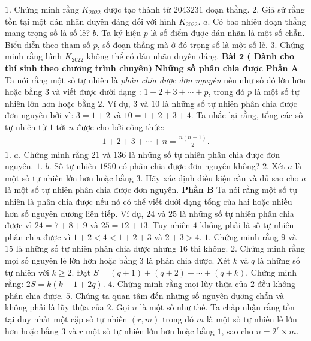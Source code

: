 \begin{multicols}{2}
	\vskip 0.1cm
	$1.$ Chứng minh rằng $K_{2022}$ được tạo thành từ $2 043 231$ đoạn thẳng.
	\vskip 0.1cm
	$2.$ Giả sử rằng tồn tại một dán nhãn duyên dáng đối với hình $K_{2022}$.
	\vskip 0.1cm
	$a.$ Có bao nhiêu đoạn thẳng mang trọng số là số lẻ?
	\vskip 0.1cm
	$b.$ Ta ký hiệu $p$ là số điểm được dán nhãn là một số chẵn. Biểu diễn theo tham số $p$, số đoạn thẳng mà ở đó trọng số là một số lẻ.
	\vskip 0.1cm 
	$3.$ Chứng minh rằng hình $K_{2022}$ không thể có dán nhãn duyên dáng.
	\vskip 0.1cm
	\textbf{\color{cackithi}Bài $\pmb{2}$ ( Dành cho thí sinh theo chương trình chuyên)}
	\vskip 0.1cm
	\textbf{\color{cackithi}Những số phân chia được}
	\vskip 0.1cm
	\textbf{\color{cackithi}Phần A}
	\vskip 0.1cm
	Ta nói rằng một số tự nhiên là \textit{phân chia được đơn nguyên} nếu như số đó lớn hơn hoặc bằng $3$ và viết được dưới dạng : $1+2+3+\cdots +p$, trong đó $p$ là một số tự nhiên lớn hơn hoặc bằng $2$. Ví dụ, $3$ và $10$ là những số tự nhiên phân chia được đơn nguyên bởi vì: $3 =1+2$  và $10=1+2+3+4$.
	\vskip 0.1cm 
	Ta nhắc lại rằng, tổng các số tự nhiên từ $1$ tới $n$ được cho bởi công thức: 
	\begin{align*}
		1+2+3+\cdots+n=\frac{n(n+1)}{2}.
	\end{align*}
	$1.$ $a.$ Chứng minh rằng $21$ và $136$ là những số tự nhiên phân chia được đơn nguyên.  
	\vskip 0.1cm
	$1.$ $b.$ Số tự nhiên $1850$ có phân chia được đơn nguyên không?
	\vskip 0.1cm
	$2.$ Xét $a$ là một số tự nhiên lớn hơn hoặc bằng $3$. Hãy xác định điều kiện cần và đủ sao cho $a$ là một số tự nhiên phân chia được đơn nguyên. 
	\vskip 0.1cm
	\textbf{\color{cackithi}Phần B}
	\vskip 0.1cm
	Ta nói rằng một số tự nhiên là phân chia được nếu nó có thể viết dưới dạng tổng của hai hoặc nhiều hơn số nguyên dương liên tiếp. Ví dụ, $24$ và $25$ là những số tự nhiên phân chia được vì $24 = 7 + 8 + 9$ và $25 = 12 + 13$. Tuy nhiên $4$ không phải là số tự nhiên phân chia được vì $1 + 2 < 4 < 1 + 2 + 3$ và $2 + 3 > 4$.
	\vskip 0.1cm
	$1.$ Chứng minh rằng $9$ và $15$ là những số tự nhiên phân chia được nhưng $16$ thì không.
	\vskip 0.1cm
	$2.$ Chứng minh rằng mọi số nguyên lẻ lớn hơn hoặc bằng $3$ là phân chia được. 
	\vskip 0.1cm
	Xét $k$ và $q$ là những số tự nhiên với $k\ge 2$.  Đặt $S=(q+1)+(q+2)+\cdots+(q+k)$. Chứng minh rằng: $2S=k(k+1+2q)$.
	\vskip 0.1cm
	$4.$ Chứng minh rằng mọi lũy thừa của $2$ đều không phân chia được. 
	 \vskip 0.1cm
	$5.$ Chúng ta quan tâm đến những số nguyên dương chẵn và không phải là lũy thừa của $2$. Gọi $n$ là một số như thế. Ta chấp nhận rằng tồn tại duy nhất một cặp số tự nhiên $(r,m)$ trong đó $m$ là một số tự nhiên lẻ lớn hơn hoặc bằng $3$ và $r$ một số tự nhiên lớn hơn hoặc bằng $1$, sao cho  $n=2^r\times m$.

\end{multicols}
